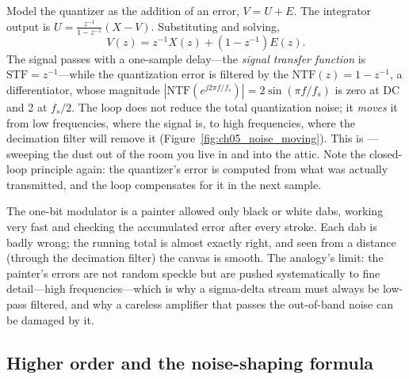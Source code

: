 Model the quantizer as the addition of an error, $V=U+E$. The integrator output is
$U=\frac{z^{-1}}{1-z^{-1}}(X-V)$. Substituting and solving,
\begin{equation}
V(z)=z^{-1}X(z)+(1-z^{-1})E(z).
\label{eq:ch05:sd1}
\end{equation}
The signal passes with a one-sample delay---the \emph{signal transfer function} is
$\mathrm{STF}=z^{-1}$---while the quantization error is filtered by the  $\mathrm{NTF}(z)=1-z^{-1}$, a differentiator, whose magnitude
$|\mathrm{NTF}(e^{j2\pi f/f_s})|=2\sin(\pi f/f_s)$ is zero at DC and 2 at $f_s/2$. The loop
does not reduce the total quantization noise; it \emph{moves} it from low frequencies, where
the signal is, to high frequencies, where the decimation filter will remove it
(Figure~\ref{fig:ch05_noise_moving}). This is ---sweeping the dust out of the
room you live in and into the attic. Note the closed-loop principle again: the quantizer's error is
computed from what was actually transmitted, and the loop compensates for it in the next sample.

\begin{analogy}
The one-bit modulator is a painter allowed only black or white dabs, working very fast and
checking the accumulated error after every stroke. Each dab is badly wrong; the running total is
almost exactly right, and seen from a distance (through the decimation filter) the canvas is
smooth. The analogy's limit: the painter's errors are not random speckle but are pushed
systematically to fine detail---high frequencies---which is why a sigma-delta stream must always be
low-pass filtered, and why a careless amplifier that passes the out-of-band noise can be damaged
by it.
\end{analogy}


\subsection{Higher order and the noise-shaping formula}

